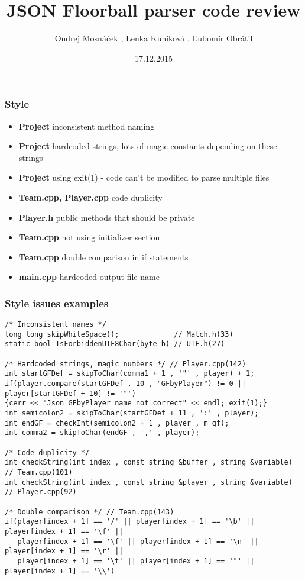 \documentclass{beamer}
\title[Team P code review]{JSON Floorball parser code review} %
\author[R Team]{Ondrej Mosnáček , Lenka Kuníková , Ľubomír Obrátil} %
\date{17.12.2015} %
\begin{document}
\begin{frame}
\titlepage %
\end{frame}


\begin{frame}
\frametitle{Style}

\begin{itemize}
\item \textbf{Project} inconsistent method naming
\item \textbf{Project} hardcoded strings, lots of magic constants depending on these strings
\item \textbf{Project} using exit(1) - code can't be modified to parse multiple files
\item \textbf{Team.cpp, Player.cpp} code duplicity
\item \textbf{Player.h} public methods that should be private
\item \textbf{Team.cpp} not using initializer section
\item \textbf{Team.cpp} double comparison in if statements
\item \textbf{main.cpp} hardcoded output file name
\end{itemize}

\end{frame}


\begin{frame}[fragile]
\frametitle{Style issues examples}

\begin{lstlisting}
/* Inconsistent names */
long long skipWhiteSpace();             // Match.h(33)
static bool IsForbiddenUTF8Char(byte b) // UTF.h(27)

/* Hardcoded strings, magic numbers */ // Player.cpp(142)
int startGFDef = skipToChar(comma1 + 1 , '"' , player) + 1; 
if(player.compare(startGFDef , 10 , "GFbyPlayer") != 0 || player[startGFDef + 10] != '"')
{cerr << "Json GFbyPlayer name not correct" << endl; exit(1);}
int semicolon2 = skipToChar(startGFDef + 11 , ':' , player);
int endGF = checkInt(semicolon2 + 1 , player , m_gf);
int comma2 = skipToChar(endGF , ',' , player);

/* Code duplicity */
int checkString(int index , const string &buffer , string &variable) // Team.cpp(101)
int checkString(int index , const string &player , string &variable) // Player.cpp(92)

/* Double comparison */ // Team.cpp(143)
if(player[index + 1] == '/' || player[index + 1] == '\b' || player[index + 1] == '\f' ||  
   player[index + 1] == '\f' || player[index + 1] == '\n' || player[index + 1] == '\r' ||
   player[index + 1] == '\t' || player[index + 1] == '"' || player[index + 1] == '\\')
\end{lstlisting}

\end{frame}
\end{document}
